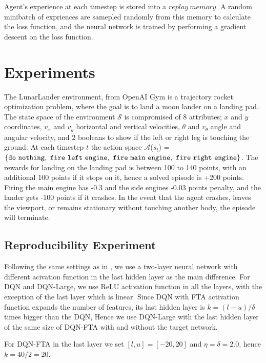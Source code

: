 \documentclass{article}
\newcommand{\cS}{\mathcal{S}}
\newcommand{\cA}{\mathcal{A}}
\begin{document}
Agent's experience at each timestep is stored into a $replay\ memory$. 
A random minibatch of expriences are samepled randomly from this memory to calculate the loss function, and the neural network is trained by performing a gradient descent on the loss function.


\section{Experiments} \label{sec:experiments}
The LunarLander environment, from OpenAI Gym \cite[]{brockman2016gym} is a trajectory rocket optimization problem, where the goal is to land a moon lander on a landing pad.
The state space of the environment $\cS$ is compromised of 8 attributes; $x$ and $y$ coordinates, $v_x$ and $v_y$ horizontal and vertical velocities, $\theta$ and $v_\theta$ angle and angular velocity, and 2 booleans to show if the left or right leg is touching the ground. At each timestep $t$ the action space $\cA$($s_t$) = $\tt\{do\ nothing,\ fire\ left\ engine,\ fire\ main\ engine,\ fire\ right\ engine\}$. The rewards for landing on the landing pad is between 100 to 140 points, with an additional 100 points if it stops on it, hence a solved episode is +200 points. Firing the main engine has -0.3 and the side engines -0.03 points penalty, and the lander gets -100 points if it crashes. In the event that the agent crashes, leaves the viewport, or remains stationary without touching another body, the episode will terminate.


\subsection{Reproducibility Experiment} \label{sub-sec:reproduc experiments}
Following the same settings as in \cite{pan2019fuzzy}, we use a two-layer neural network with different acivation function in the last hidden layer as the main difference. For DQN and DQN-Large, we use ReLU activation function in all the layers, with the exception of the last layer which is linear.
Since DQN with FTA activation function expands the number of features, its last hidden layer is $k = (l-u)/\delta$ times bigger than the DQN, Hence we use DQN-Large with the last hidden layer of the same size of DQN-FTA with and without the target network.

For DQN-FTA in the last layer we set $[l, u] = [-20, 20]$ and $\eta = \delta = 2.0$, hence $k = 40/2 = 20$.
\end{document}
